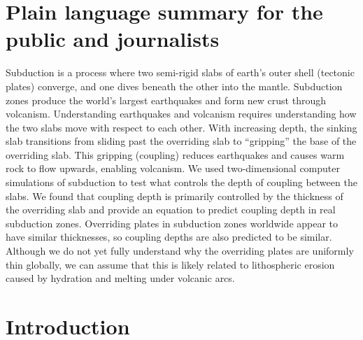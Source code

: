 \documentclass[draft,linenumbers]{agujournal2018} %
\providecommand{\DIFdeltex}[1]{{\protect\color{red} \scriptsize #1}} %
\providecommand{\DIFaddbegin}{} %
\providecommand{\DIFaddend}{} %
\providecommand{\DIFdelbegin}{} %
\providecommand{\DIFdelend}{} %
\providecommand{\DIFdel}[1]{\texorpdfstring{\DIFdeltex{#1}}{}} %
\newcommand{\DIFscaledelfig}{0.3}
\newlength{\DIFdelgraphicswidth} %
\newlength{\DIFdelgraphicsheight} %
\newcommand{\DIFaddincludegraphics}[2][]{{\color{blue}\fbox{\DIFOincludegraphics[#1]{#2}}}} %
\newcommand{\DIFdelincludegraphics}[2][]{%
\sbox{\DIFdelgraphicsbox}{\DIFOincludegraphics[#1]{#2}}%
\settoboxwidth{\DIFdelgraphicswidth}{\DIFdelgraphicsbox} %
\settoboxtotalheight{\DIFdelgraphicsheight}{\DIFdelgraphicsbox} %
\scalebox{\DIFscaledelfig}{%
\parbox[b]{\DIFdelgraphicswidth}{\usebox{\DIFdelgraphicsbox}\\[-\baselineskip] \rule{\DIFdelgraphicswidth}{0em}}\llap{\resizebox{\DIFdelgraphicswidth}{\DIFdelgraphicsheight}{%
\setlength{\unitlength}{\DIFdelgraphicswidth}%
\begin{picture}(1,1)%
\thicklines\linethickness{2pt} %
{\color[rgb]{1,0,0}\put(0,0){\framebox(1,1){}}}%
{\color[rgb]{1,0,0}\put(0,0){\line( 1,1){1}}}%
{\color[rgb]{1,0,0}\put(0,1){\line(1,-1){1}}}%
\end{picture}%
}\hspace*{3pt}}} %
} %
\DeclareRobustCommand{\DIFaddbegin}{\DIFOaddbegin \let\includegraphics\DIFaddincludegraphics} %
\DeclareRobustCommand{\DIFaddend}{\DIFOaddend \let\includegraphics\DIFOincludegraphics} %
\DeclareRobustCommand{\DIFdelbegin}{\DIFOdelbegin \let\includegraphics\DIFdelincludegraphics} %
\DeclareRobustCommand{\DIFdelend}{\DIFOaddend \let\includegraphics\DIFOincludegraphics} %
\begin{document}
\DIFdelbegin \section*{\DIFdel{Plain language summary for the public and journalists}}
\DIFdel{Subduction is a process where two semi-rigid slabs of earth's outer shell (tectonic plates) converge, and one dives beneath the other into the mantle. Subduction zones produce the world's largest earthquakes and form new crust through volcanism. Understanding earthquakes and volcanism requires understanding how the two slabs move with respect to each other. With increasing depth, the sinking slab transitions from sliding past the overriding slab to “gripping” the base of the overriding slab. This gripping (coupling) reduces earthquakes and causes warm rock to flow upwards, enabling volcanism. We used two-dimensional computer simulations of subduction to test what controls the depth of coupling between the slabs. We found that coupling depth is primarily controlled by the thickness of the overriding slab and provide an equation to predict coupling depth in real subduction zones. Overriding plates in subduction zones worldwide appear to have similar thicknesses, so coupling depths are also predicted to be similar. Although we do not yet fully understand why the overriding plates are uniformly thin globally, we can assume that this is likely related to lithospheric erosion caused by hydration and melting under volcanic arcs.
}%

\DIFdelend \DIFaddbegin {}
\vskip18pt
\DIFaddend \section{Introduction}
\DIFaddbegin
\end{document}
